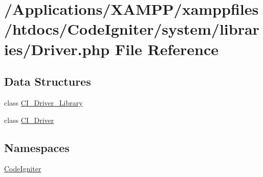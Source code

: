\hypertarget{system_2libraries_2_driver_8php}{}\section{/\+Applications/\+X\+A\+M\+P\+P/xamppfiles/htdocs/\+Code\+Igniter/system/libraries/\+Driver.php File Reference}
\label{system_2libraries_2_driver_8php}
\subsection*{Data Structures}
\begin{DoxyCompactItemize}
\item 
class \mbox{\hyperlink{class_c_i___driver___library}{C\+I\+\_\+\+Driver\+\_\+\+Library}}
\item 
class \mbox{\hyperlink{class_c_i___driver}{C\+I\+\_\+\+Driver}}
\end{DoxyCompactItemize}
\subsection*{Namespaces}
\begin{DoxyCompactItemize}
\item 
 \mbox{\hyperlink{namespace_code_igniter}{Code\+Igniter}}
\end{DoxyCompactItemize}
